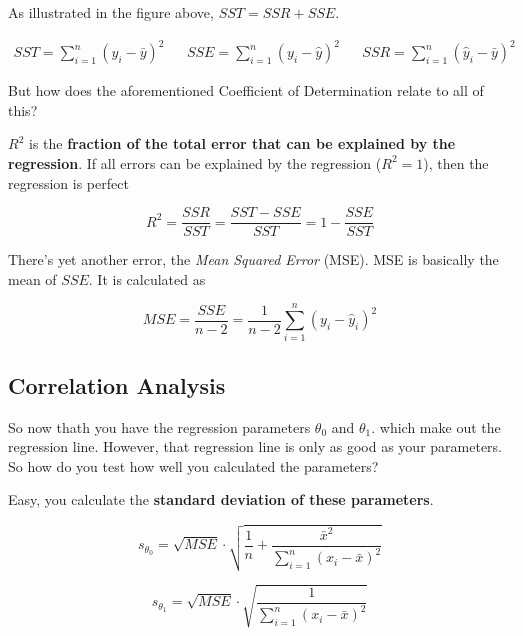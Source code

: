 \documentclass[a4paper, 11pt]{article}
\begin{document}
\vspace{10px}

As illustrated in the figure above, $SST = SSR + SSE$.

\begin{align*}
    SST = \sum^{n}_{i=1}(y_{i}-\bar y)^2 && SSE=\sum^{n}_{i=1}(y_{i}-\hat y)^2 && SSR=\sum^{n}_{i=1}(\hat y_{i}-\bar y)^2
\end{align*}


But how does the aforementioned Coefficient of Determination relate to all of this? 

$R^2$ is the \textbf{fraction of the total error that can be explained by the regression}. If all errors can be explained by the regression ($R^2 = 1$), then the regression is perfect

\begin{equation}
	 R^2 = \frac{SSR}{SST} = \frac{SST-SSE}{SST} = 1 - \frac{SSE}{SST}
\end{equation}

\vspace{10px}

There's yet another error, the \textit{Mean Squared Error} (MSE). MSE is basically the mean of $SSE$. It is calculated as

\begin{equation}
	MSE = \frac{SSE}{n-2} = \frac{1}{n-2}\sum_{i=1}^{n}(y_{i}-\hat{y}^{}_{i})^2
\end{equation}

\newpage

\subsection{Correlation Analysis}

So now thath you have the regression parameters $\theta^{}_{0}$ and $\theta^{}_{1}$. which make out the regression line. However, that regression line is only as good as your parameters. So how do you test how well you calculated the parameters?

Easy, you calculate the \textbf{standard deviation of these parameters}.

\begin{equation}
	s_{\theta_{0}} = \sqrt{MSE} \cdot \sqrt{\frac{1}{n} + \frac{\bar{x}^2}{\sum_{i=1}^{n}{(x_i-\bar{x})^2}}}
\end{equation}

\begin{equation}
	s_{\theta_{1}} = \sqrt{MSE}\cdot \sqrt{\frac{1}{\sum_{i=1}^{n}{(x_i-\bar{x})^2}}}
\end{equation}
\end{document}
